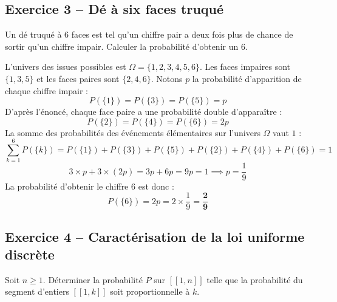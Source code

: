 \documentclass[11pt,a4paper]{article}
\begin{document}
\vspace{0.3cm}

\subsection*{Exercice 3 -- Dé à six faces truqué}

Un dé truqué à 6 faces est tel qu'un chiffre pair a deux fois plus de chance de sortir qu'un chiffre impair. Calculer la probabilité d'obtenir un $6$.

\begin{correctionbox}
L'univers des issues possibles est $\Omega = \{1, 2, 3, 4, 5, 6\}$.
Les faces impaires sont $\{1, 3, 5\}$ et les faces paires sont $\{2, 4, 6\}$.
Notons $p$ la probabilité d'apparition de chaque chiffre impair :
\[
P(\{1\}) = P(\{3\}) = P(\{5\}) = p
\]
D'après l'énoncé, chaque face paire a une probabilité double d'apparaître :
\[
P(\{2\}) = P(\{4\}) = P(\{6\}) = 2p
\]
La somme des probabilités des événements élémentaires sur l'univers $\Omega$ vaut $1$ :
\[
\sum_{k=1}^6 P(\{k\}) = P(\{1\}) + P(\{3\}) + P(\{5\}) + P(\{2\}) + P(\{4\}) + P(\{6\}) = 1
\]
\[
3 \times p + 3 \times (2p) = 3p + 6p = 9p = 1 \implies p = \frac{1}{9}
\]
La probabilité d'obtenir le chiffre $6$ est donc :
\[
P(\{6\}) = 2p = 2 \times \frac{1}{9} = \mathbf{\frac{2}{9}}
\]
\end{correctionbox}

\vspace{0.3cm}

\subsection*{Exercice 4 -- Caractérisation de la loi uniforme discrète}

Soit $n \ge 1$. Déterminer la probabilité $P$ sur $[\![1, n]\!]$ telle que la probabilité du segment d'entiers $[\![1, k]\!]$ soit proportionnelle à $k$.
\end{document}

